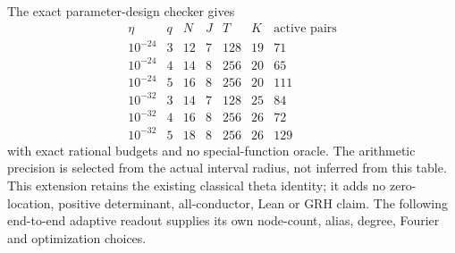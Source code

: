 The exact parameter-design checker gives
\[
\begin{array}{c|c|rrrr|r}
\eta&q&N&J&T&K&\text{active pairs}\\\hline
10^{-24}&3&12&7&128&19&71\\
10^{-24}&4&14&8&256&20&65\\
10^{-24}&5&16&8&256&20&111\\
10^{-32}&3&14&7&128&25&84\\
10^{-32}&4&16&8&256&26&72\\
10^{-32}&5&18&8&256&26&129
\end{array}
\]
with exact rational budgets and no special-function oracle.
The arithmetic precision is selected from the actual interval radius,
not inferred from this table. This extension retains the existing
classical theta identity; it adds no zero-location, positive determinant,
all-conductor, Lean or GRH claim. The following end-to-end adaptive readout supplies its own node-count,
alias, degree, Fourier and optimization choices.
